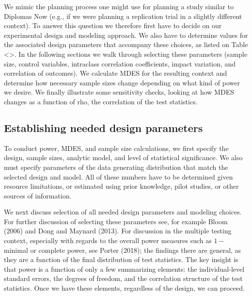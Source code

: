 \documentclass[
]{article}
\begin{document}
We mimic the planning process one might use for planning a study similar
to Diplomas Now (e.g., if we were planning a replication trial in a
slightly different context). To answer this question we therefore first
have to decide on our experimental design and modeling approach. We also
have to determine values for the associated design parameters that
accompany these choices, as listed on Table \textless{}\textgreater. In
the following sections we walk through selecting these parameters
(sample size, control variables, intraclass correlation coefficients,
impact variation, and correlation of outcomes). We calculate MDES for
the resulting context and determine how necessary sample sizes change
depending on what kind of power we desire. We finally illustrate some
sensitivity checks, looking at how MDES changes as a function of rho,
the correlation of the test statistics.

\subsection{Establishing needed design parameters}

To conduct power, MDES, and sample size calculations, we first specify
the design, sample sizes, analytic model, and level of statistical
significance. We also must specify parameters of the data generating
distribution that match the selected design and model. All of these
numbers have to be determined given resource limitations, or estimated
using prior knowledge, pilot studies, or other sources of information.

We next discuss selection of all needed design parameters and modeling
choices. For further discussion of selecting these parameters see, for
example Bloom (2006) and Dong and Maynard (2013). For discussion in the
multiple testing context, especially with regards to the overall power
measures such as \(1-\)minimal or complete power, see Porter (2018); the
findings there are general, as they are a function of the final
distribution of test statistics. The key insight is that power is a
function of only a few summarizing elements: the individual-level
standard errors, the degrees of freedom, and the correlation structure
of the test statistics. Once we have these elements, regardless of the
design, we can proceed.
\end{document}
